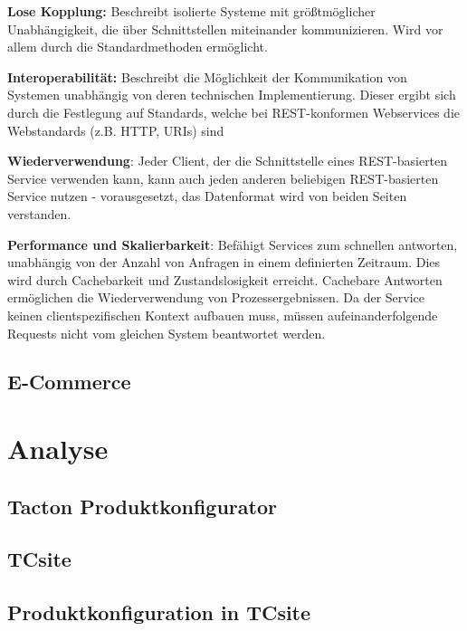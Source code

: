 \documentclass[12pt,a4paper,bibliography=totocnumbered,listof=totoc]{scrartcl}
\begin{document}
\begin{compactitem}
\item \textbf{Lose Kopplung:} Beschreibt isolierte Systeme mit größtmöglicher Unabhängigkeit, die über Schnittstellen miteinander kommunizieren. Wird vor allem  durch die Standardmethoden ermöglicht.
\item \textbf{Interoperabilität:} Beschreibt die Möglichkeit der Kommunikation von Systemen unabhängig von deren technischen Implementierung. Dieser ergibt sich durch die Festlegung auf Standards, welche bei REST-konformen Webservices die Webstandards (z.B. HTTP, URIs) sind 
\item \textbf{Wiederverwendung}: Jeder Client, der die Schnittstelle eines REST-basierten Service verwenden kann, kann auch jeden anderen beliebigen REST-basierten Service nutzen - vorausgesetzt, das Datenformat wird von beiden Seiten verstanden.
\item \textbf{Performance und Skalierbarkeit}: Befähigt Services zum schnellen antworten, unabhängig von der Anzahl von Anfragen in einem definierten Zeitraum. Dies wird durch Cachebarkeit und Zustandslosigkeit erreicht. Cachebare Antworten ermöglichen die Wiederverwendung von Prozessergebnissen. Da der Service keinen clientspezifischen Kontext aufbauen muss, müssen aufeinanderfolgende Requests nicht vom gleichen System beantwortet werden.
\end{compactitem}

\subsection{E-Commerce}

\pagebreak

\section{Analyse}

\subsection{Tacton Produktkonfigurator}

\subsection{TCsite}

\subsection{Produktkonfiguration in TCsite}
\end{document}
